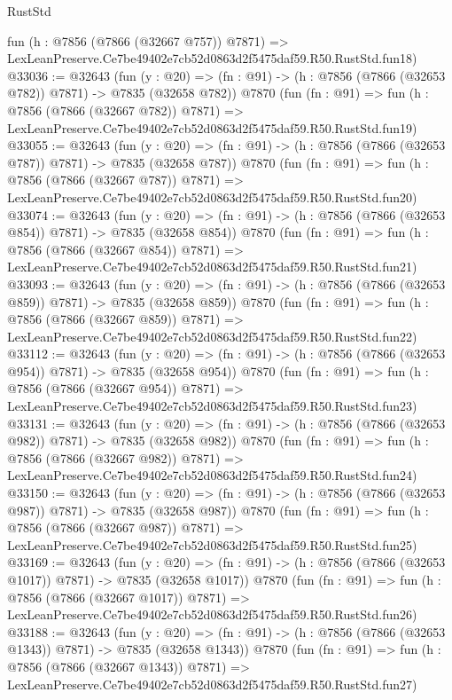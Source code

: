 \begin{lexlean}{RustStd}
\begin{coremodule}
    fun (h : @7856 (@7866 (@32667 @757)) @7871) =>
    LexLeanPreserve.Ce7be49402e7cb52d0863d2f5475daf59.R50.RustStd.fun18)
@33036 := @32643
    (fun (y : @20) => (fn : @91) -> (h : @7856 (@7866 (@32653 @782)) @7871) -> @7835 (@32658 @782))
    @7870
    (fun (fn : @91) =>
    fun (h : @7856 (@7866 (@32667 @782)) @7871) =>
    LexLeanPreserve.Ce7be49402e7cb52d0863d2f5475daf59.R50.RustStd.fun19)
@33055 := @32643
    (fun (y : @20) => (fn : @91) -> (h : @7856 (@7866 (@32653 @787)) @7871) -> @7835 (@32658 @787))
    @7870
    (fun (fn : @91) =>
    fun (h : @7856 (@7866 (@32667 @787)) @7871) =>
    LexLeanPreserve.Ce7be49402e7cb52d0863d2f5475daf59.R50.RustStd.fun20)
@33074 := @32643
    (fun (y : @20) => (fn : @91) -> (h : @7856 (@7866 (@32653 @854)) @7871) -> @7835 (@32658 @854))
    @7870
    (fun (fn : @91) =>
    fun (h : @7856 (@7866 (@32667 @854)) @7871) =>
    LexLeanPreserve.Ce7be49402e7cb52d0863d2f5475daf59.R50.RustStd.fun21)
@33093 := @32643
    (fun (y : @20) => (fn : @91) -> (h : @7856 (@7866 (@32653 @859)) @7871) -> @7835 (@32658 @859))
    @7870
    (fun (fn : @91) =>
    fun (h : @7856 (@7866 (@32667 @859)) @7871) =>
    LexLeanPreserve.Ce7be49402e7cb52d0863d2f5475daf59.R50.RustStd.fun22)
@33112 := @32643
    (fun (y : @20) => (fn : @91) -> (h : @7856 (@7866 (@32653 @954)) @7871) -> @7835 (@32658 @954))
    @7870
    (fun (fn : @91) =>
    fun (h : @7856 (@7866 (@32667 @954)) @7871) =>
    LexLeanPreserve.Ce7be49402e7cb52d0863d2f5475daf59.R50.RustStd.fun23)
@33131 := @32643
    (fun (y : @20) => (fn : @91) -> (h : @7856 (@7866 (@32653 @982)) @7871) -> @7835 (@32658 @982))
    @7870
    (fun (fn : @91) =>
    fun (h : @7856 (@7866 (@32667 @982)) @7871) =>
    LexLeanPreserve.Ce7be49402e7cb52d0863d2f5475daf59.R50.RustStd.fun24)
@33150 := @32643
    (fun (y : @20) => (fn : @91) -> (h : @7856 (@7866 (@32653 @987)) @7871) -> @7835 (@32658 @987))
    @7870
    (fun (fn : @91) =>
    fun (h : @7856 (@7866 (@32667 @987)) @7871) =>
    LexLeanPreserve.Ce7be49402e7cb52d0863d2f5475daf59.R50.RustStd.fun25)
@33169 := @32643
    (fun (y : @20) =>
    (fn : @91) -> (h : @7856 (@7866 (@32653 @1017)) @7871) -> @7835 (@32658 @1017))
    @7870
    (fun (fn : @91) =>
    fun (h : @7856 (@7866 (@32667 @1017)) @7871) =>
    LexLeanPreserve.Ce7be49402e7cb52d0863d2f5475daf59.R50.RustStd.fun26)
@33188 := @32643
    (fun (y : @20) =>
    (fn : @91) -> (h : @7856 (@7866 (@32653 @1343)) @7871) -> @7835 (@32658 @1343))
    @7870
    (fun (fn : @91) =>
    fun (h : @7856 (@7866 (@32667 @1343)) @7871) =>
    LexLeanPreserve.Ce7be49402e7cb52d0863d2f5475daf59.R50.RustStd.fun27)

\end{coremodule}
\end{lexlean}
